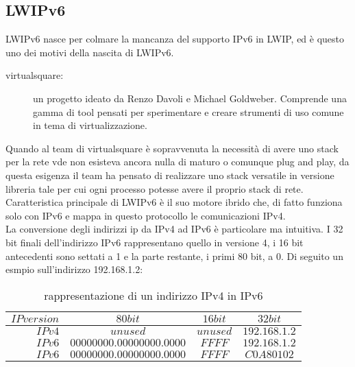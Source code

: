 \subsection{LWIPv6}
LWIPv6 nasce per colmare la mancanza del supporto IPv6 in LWIP, ed \`e questo uno dei motivi della nascita di LWIPv6\cite{K6}.\\
\begin{description}                     %
  \item[virtualsquare\cite{K15}: ] un progetto ideato da Renzo Davoli e Michael Goldweber. Comprende una gamma di tool pensati per sperimentare e creare strumenti di uso comune in tema di virtualizzazione.
\end{description}
Quando al team di virtualsquare \`e sopravvenuta la necessit\`a di avere uno stack per la rete vde non esisteva ancora nulla di maturo o comunque plug and play, da questa esigenza il team ha pensato di realizzare uno stack versatile in versione libreria tale per cui ogni processo potesse avere il proprio stack di rete.\\
Caratteristica principale di LWIPv6 \`e il suo motore ibrido che, di fatto funziona solo con IPv6 e mappa in questo protocollo le comunicazioni IPv4.\\
La conversione degli indirizzi ip da IPv4 ad IPv6 \`e particolare ma intuitiva. I 32 bit finali dell'indirizzo IPv6 rappresentano quello in versione 4, i 16 bit antecedenti sono settati a 1 e la parte restante, i primi 80 bit, a 0. Di seguito un esmpio sull'indirizzo 192.168.1.2:
\begin{table}[h]                        %
\begin{center}                          %
\begin{tabular}{r|c|c|c}                  %
\hline
$IP version$ & $80 bit$ & $16 bit$ & $32 bit$\\
\hline \hline                         %
$IPv4$ & $unused$  & $unused$  & $192.168.1.2$\\           %
\hline                                  %
$IPv6$ & $00000000.00000000.0000$ & $FFFF$ & $192.168.1.2$\\           %
\hline                                  %
$IPv6$ & $00000000.00000000.0000$ & $FFFF$ & $C0A80102$\\
\hline                           %
\end{tabular}
\caption[IPv4 to IPv6 conversion]{rappresentazione di un indirizzo IPv4 in IPv6}\label{tab:IPv4toIPv6}
\end{center}
\end{table}


